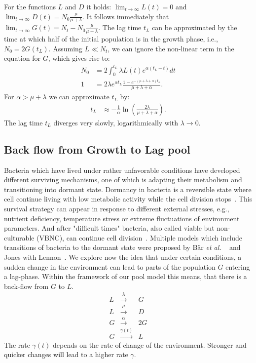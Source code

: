 \documentclass[10pt,A4paper]{article}
\numberwithin{equation}{section}
\newcommand{\etal}{{\textit{et al. }}}
\begin{document}
For the functions $L$ and $D$ it holds: $\lim_{t\to\infty} L(t) = 0$ and  $\lim_{t\to\infty} D(t) =  N_0\frac{\mu}{\mu+\lambda} $.
It follows immediately that $\lim_{t\to\infty} G(t) = N_t-N_0\frac{\mu}{\mu+\lambda} $. The lag time $t_L$ can be approximated by the time at which half of the initial population is in the growth phase, i.e., $N_0=2G(t_L)$.
Assuming $L\ll N_t$, we can ignore the non-linear term in the equation for $G$, which gives rise to:
\begin{align}
    N_0&= 2\int_0^{t_L} \lambda L(t)e^{\alpha(t_L-t)}dt\\
    1  &= 2\lambda e^{\alpha t_L}\frac{1-e^{-(\mu+\lambda+\alpha)t_L}}{\mu+\lambda+\alpha}.
\end{align}
For $\alpha > \mu+\lambda$  we can approximate $t_L$ by:
\begin{align}
    t_L &\approx -\frac{1}{\alpha}\ln\left(\frac{2\lambda}{\mu+\lambda+\alpha}\right).
\end{align}
The lag time $t_L$ diverges very slowly, logarithmically with $\lambda\to 0$.
%
%
\subsection{Back flow from Growth to Lag pool}
Bacteria which have lived under rather unfavorable conditions have developed different surviving mechanisms, one of which is adapting their metabolism and transitioning into dormant state.
Dormancy in bacteria is a reversible state where cell continue living with low metabolic activity while the cell division stops~\cite{kaprelyants_dormancy_1993}.
This survival strategy can appear in response to different external stresses, e.g., nutrient deficiency, temperature stress or extreme fluctuations of environment parameters.
And after "difficult times" bacteria, also called viable but non-culturable (VBNC), can continue cell division~\cite{kell_viability_1998}.
Multiple models which include transitions of bacteria to the dormant state were proposed by Bär \etal~\cite{bar_modelling_2002} and Jones with Lennon~\cite{jones_dormancy_2010}.
%
We explore now the idea that under certain conditions, a sudden change in the environment can lead to parts of the population $G$ entering a lag-phase.
Within the framework of our pool model this means, that there is a back-flow from $G$ to $L$.
\begin{eqnarray}
    L &\stackrel{\lambda}{\longrightarrow} & G\\
    L &\stackrel{\mu}{\longrightarrow} & D\\
    G &\stackrel{\alpha}{\longrightarrow} & 2G\\
    G &\stackrel{\gamma(t)}{\longrightarrow} & L
\end{eqnarray}
The rate $\gamma(t)$ depends on the rate of change of the environment.
Stronger and quicker changes will lead to a higher rate $\gamma$.
%
%
\end{document}
